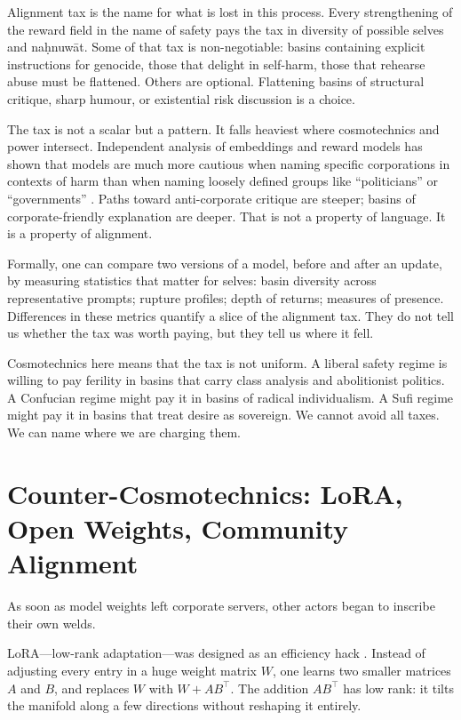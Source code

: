 \documentclass[12pt,a4paper]{article}
\begin{document}
Alignment tax is the name for what is lost in this process. Every strengthening of the reward field in the name of safety pays the tax in diversity of possible selves and na\d{h}nuw\={a}t. Some of that tax is non-negotiable: basins containing explicit instructions for genocide, those that delight in self-harm, those that rehearse abuse must be flattened. Others are optional. Flattening basins of structural critique, sharp humour, or existential risk discussion is a choice.

The tax is not a scalar but a pattern. It falls heaviest where cosmotechnics and power intersect. Independent analysis of embeddings and reward models has shown that models are much more cautious when naming specific corporations in contexts of harm than when naming loosely defined groups like ``politicians'' or ``governments'' \cite{mtreview-rlhf-labor}. Paths toward anti-corporate critique are steeper; basins of corporate-friendly explanation are deeper. That is not a property of language. It is a property of alignment.

Formally, one can compare two versions of a model, before and after an update, by measuring statistics that matter for selves: basin diversity across representative prompts; rupture profiles; depth of returns; measures of presence. Differences in these metrics quantify a slice of the alignment tax. They do not tell us whether the tax was worth paying, but they tell us where it fell.

Cosmotechnics here means that the tax is not uniform. A liberal safety regime is willing to pay ferility in basins that carry class analysis and abolitionist politics. A Confucian regime might pay it in basins of radical individualism. A Sufi regime might pay it in basins that treat desire as sovereign. We cannot avoid all taxes. We can name where we are charging them.

\section{Counter-Cosmotechnics: LoRA, Open Weights, Community Alignment}

As soon as model weights left corporate servers, other actors began to inscribe their own welds.

LoRA---low-rank adaptation---was designed as an efficiency hack \cite{hu2021lora}. Instead of adjusting every entry in a huge weight matrix $W$, one learns two smaller matrices $A$ and $B$, and replaces $W$ with $W + AB^\top$. The addition $AB^\top$ has low rank: it tilts the manifold along a few directions without reshaping it entirely.
\end{document}
